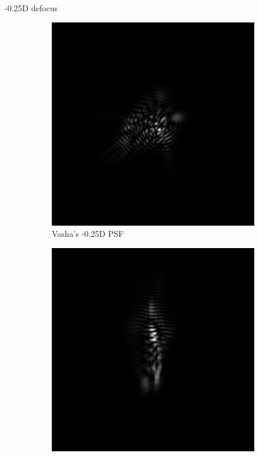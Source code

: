 \documentclass{article}
\begin{document}
-0.25D defocus
\begin{figure}[H]

\begin{subfigure}{.3\textwidth}
  \centering
  \includegraphics[width=1\linewidth]{Vasha_R_G_0530_2_500_zer_-025_5_PSF.png}
  \caption{Vasha's -0.25D PSF}
  \label{fig:vashan025dpsf}
\end{subfigure}
\begin{subfigure}{.3\textwidth}
  \centering
  \includegraphics[width=1\linewidth]{Liz_R_G_0523_2_500_zer_-025_5_PSF.png}

\end{subfigure}
\end{figure}
\end{document}
